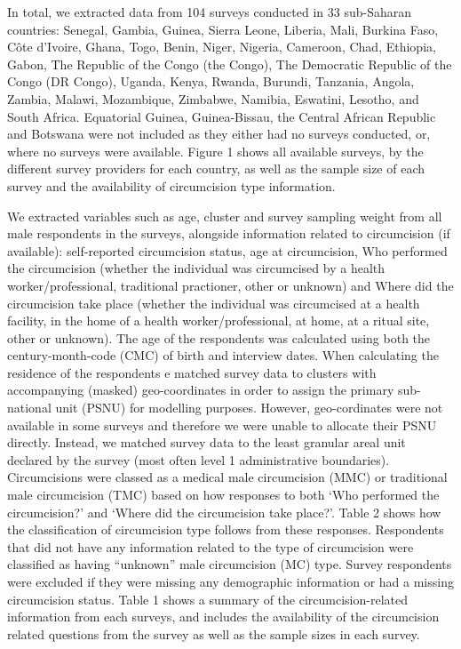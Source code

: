 \documentclass{article}
\begin{document}
\begin{appendix}
In total, we extracted data from 104 surveys conducted in 33 sub-Saharan countries: Senegal, Gambia, Guinea, Sierra Leone, Liberia, Mali, Burkina Faso, Côte d’Ivoire, Ghana, Togo, Benin, Niger, Nigeria, Cameroon, Chad, Ethiopia, Gabon, The Republic of the Congo (the Congo), The Democratic Republic of the Congo (DR Congo), Uganda, Kenya, Rwanda, Burundi, Tanzania, Angola, Zambia, Malawi, Mozambique, Zimbabwe, Namibia, Eswatini, Lesotho, and South Africa. {\color{red}Equatorial Guinea, Guinea-Bissau, the Central African Republic and Botswana were not included as they either had no surveys conducted, or, where no surveys were available.} Figure 1 shows all available surveys, by the different survey providers for each country, as well as the sample size of each survey and the availability of circumcision type information. 

We extracted variables such as age, cluster and survey sampling weight from all male respondents in the surveys, alongside information related to circumcision (if available): self-reported circumcision status, age at circumcision, Who performed the circumcision (whether the individual was circumcised by a health worker/professional, traditional practioner, other or unknown) and Where did the circumcision take place (whether the individual was circumcised at a health facility, in the home of a health worker/professional, at home, at a ritual site, other or unknown). The age of the respondents was calculated using both the century-month-code (CMC) of birth and interview dates. When calculating the residence of the respondents e matched survey data to clusters with accompanying (masked) geo-coordinates in order to assign the primary sub-national unit (PSNU) for modelling purposes. However, geo-cordinates were not available in some surveys and therefore we were unable to allocate their PSNU directly. Instead, we matched survey data to the least granular areal unit declared by the survey (most often level 1 administrative boundaries). Circumcisions were classed as a medical male circumcision (MMC) or traditional male circumcision (TMC) based on how responses to both ‘Who performed the circumcision?’ and ‘Where did the circumcision take place?’. Table 2 shows how the classification of circumcision type follows from these responses. Respondents that did not have any information related to the type of circumcision were classified as having “unknown” male circumcision (MC) type. Survey respondents were excluded if they were missing any demographic information or had a missing circumcision status. Table 1 shows a summary of the circumcision-related information from each surveys, and includes the availability of the circumcision related questions from the survey as well as the sample sizes in each survey. %


\end{appendix}
\end{document}
